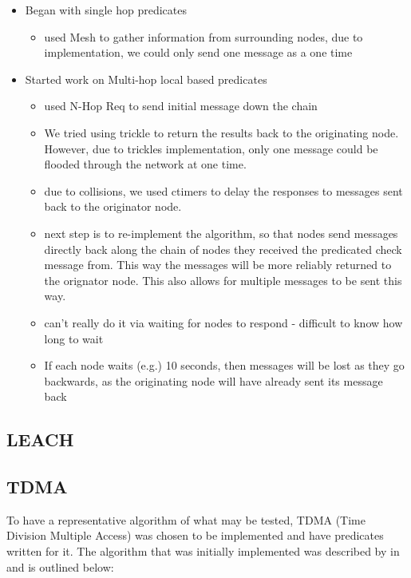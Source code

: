 \begin{itemize}
	\item[] Began with single hop predicates
	\begin{itemize}
		\item used Mesh to gather information from surrounding nodes, due to implementation, we could only send one message as a one time
	\end{itemize}	
	\item[] Started work on Multi-hop local based predicates
	\begin{itemize}
		\item used N-Hop Req to send initial message down the chain
		\item We tried using trickle to return the results back to the originating node. However, due to trickles implementation, only one message could be flooded through the network at one time. 
		\item due to collisions, we used ctimers to delay the responses to messages sent back to the originator node.
		\item next step is to re-implement the algorithm, so that nodes send messages directly back along the chain of nodes they received the predicated check message from. This way the messages will be more reliably returned to the orignator node. This also allows for multiple messages to be sent this way.
		\item can't really do it via waiting for nodes to respond - difficult to know how long to wait
		\item[] If each node waits (e.g.) 10 seconds, then messages will be lost as they go backwards, as the originating node will have already sent its message back
	\end{itemize}	
\end{itemize}


\subsection{LEACH}
\cite{LEACH}

\subsection{TDMA}

To have a representative algorithm of what may be tested, TDMA (Time Division Multiple Access) was chosen to be implemented and have predicates written for it. The algorithm that was initially implemented was described by \citeauthor{DCATechReport} in \cite[p.~4]{DCATechReport} and is outlined below:

